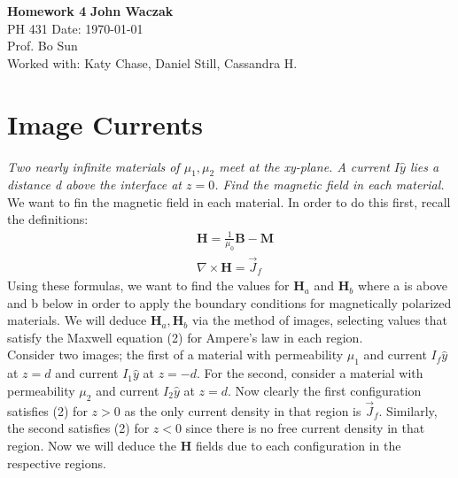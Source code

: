 \documentclass[a4paper, 11pt]{article}
\begin{document}
\noindent
\large\textbf{Homework 4} \hfill \textbf{John Waczak} \\
\normalsize PH 431 \hfill  Date: \today \\
Prof. Bo Sun  \\
Worked with: Katy Chase, Daniel Still, Cassandra H. \\


\section*{Image Currents}
\textit{Two nearly infinite materials of $\mu_1, \mu_2$ meet at the xy-plane. A current $I\hat{y}$ lies a distance d above the interface at $z=0$. Find the magnetic field in each material.} \\ 

\noindent We want to fin the magnetic field in each material. In order to do this first, recall the definitions: 
	\begin{align}
		&\mathbf{H} = \frac{1}{\mu_0}\mathbf{B} - \mathbf{M} \\ 
		&\nabla \times \mathbf{H} = \vec{J}_f
	\end{align}
Using these formulas, we want to find the values for $\mathbf{H}_a$ and $\mathbf{H}_b$ where a is above and b below in order to apply the boundary conditions for magnetically polarized materials. We will deduce $\mathbf{H}_a, \mathbf{H}_b$ via the method of images, selecting values that satisfy the Maxwell equation (2) for Ampere's law in each region. \\ 

\noindent Consider two images; the first of a material with permeability $\mu_1$ and current $I_f\hat{y}$ at $z=d$ and current $I_1\hat{y}$ at $z=-d$. For the second, consider a material with permeability $\mu_2$ and current $I_2\hat{y}$ at  $z=d$. Now clearly the first configuration satisfies (2) for $z>0$ as the only current density in that region is $\vec{J}_f$. Similarly, the second satisfies (2) for $z<0$ since there is no free current density in that region. Now we will deduce the \textbf{H} fields due to each configuration in the respective regions. 
\end{document}
